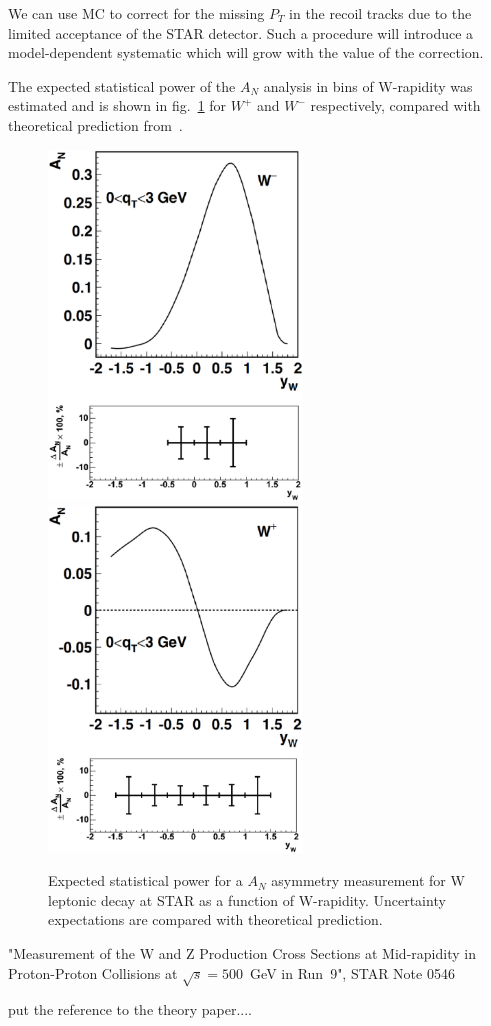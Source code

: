 \documentclass[12pt]{article}
\begin{document}
We can use MC to correct for the missing $P_{T}$ in the recoil tracks due to the
limited acceptance of the STAR detector. Such a procedure will introduce a
model-dependent systematic which will grow with the value of the correction.

The expected statistical power of the $A_N$ analysis in bins of W-rapidity was
estimated and is shown in fig.~\ref{fig:MC_Wmeas_stat} for $W^+$ and $W^-$
respectively, compared with theoretical prediction from~\cite{W_paper}.

\begin{figure}[tbhp]
\begin{center}
\includegraphics[width=6.75cm]{images/anapow_w_minus.eps}
\includegraphics[width=6.75cm]{images/anapow_w_plus.eps}
\end{center}
\caption{\label{fig:MC_Wmeas_stat} Expected statistical power for a $A_N$ asymmetry measurement for W leptonic decay at STAR as a function of W-rapidity. Uncertainty expectations are compared with theoretical prediction.}
\end{figure}


\begin{thebibliography}{9}

"Measurement of the W and Z Production Cross Sections at Mid-rapidity in
Proton-Proton Collisions at $\sqrt{s} = 500$~GeV in Run~9", STAR Note 0546

put the reference to the theory paper....

\end{thebibliography}
\end{document}
